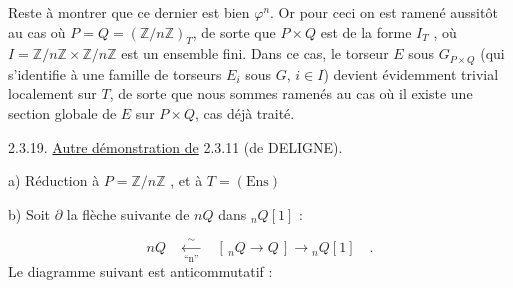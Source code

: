 Reste à montrer que ce dernier est bien $\varphi^n$. Or pour ceci on est ramené aussitôt au cas où $P=Q = (\mathbb{Z}/n\mathbb{Z})_T$, de sorte que $P \times Q$ est de la forme $I_T$ , où $I = \mathbb{Z}/n\mathbb{Z} \times \mathbb{Z}/n\mathbb{Z}$ est un ensemble fini. Dans ce cas, le torseur $E$ sous $G_{P \times Q}$ (qui s'identifie à une famille de torseurs $E_i$ sous $G$, $i \in I$) devient évidemment trivial localement sur $T$, de sorte que nous sommes ramenés au cas où il existe une section globale de $E$ sur $P \times Q$, cas déjà traité.

2.3.19.  \underline{Autre démonstration de} 2.3.11 (de DELIGNE).

a)  Réduction à $P = \mathbb{Z}/n\mathbb{Z}$ , et à $T = (\mathrm{Ens})$

b)  Soit $\partial$ la flèche suivante de $nQ$ dans ${}_nQ[1]$ :

\begin{equation*}
nQ \quad \xleftarrow[\mbox{``n''}]{\sim} \quad [\,{}_nQ \longrightarrow Q\,] \longrightarrow {}_nQ[1] \quad .
\end{equation*}
Le diagramme suivant est anticommutatif :

